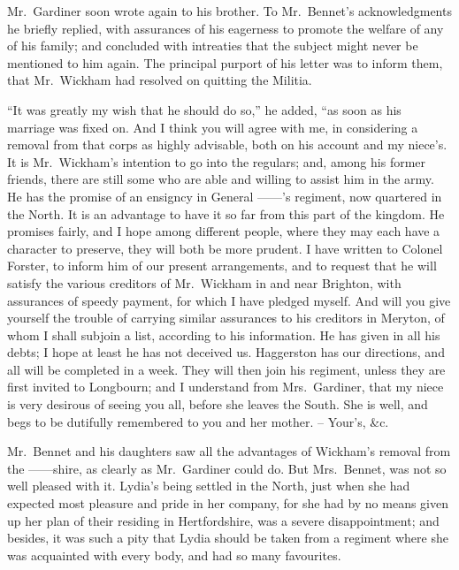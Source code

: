 \strut

Mr.\ Gardiner soon wrote again to his brother. To
Mr.\ Bennet’s acknowledgments he briefly replied, with
assurances of his eagerness to promote the welfare of any
of his family; and concluded with intreaties that the
subject might never be mentioned to him again. The
principal purport of his letter was to inform them, that
Mr.\ Wickham had resolved on quitting the Militia.

“It was greatly my wish that he should do so,” he
added, “as soon as his marriage was fixed on. And
I think you will agree with me, in considering a removal
from that corps as highly advisable, both on his account
and my niece’s. It is Mr.\ Wickham’s intention to go into
the regulars; and, among his former friends, there are
still some who are able and willing to assist him in the
army. He has the promise of an ensigncy in General
\hbox{------’s} regiment, now quartered in the North. It is an
advantage to have it so far from this part of the kingdom.
He promises fairly, and I hope among different people,
where they may each have a character to preserve, they
will both be more prudent. I have written to Colonel
Forster, to inform him of our present arrangements, and
to request that he will satisfy the various creditors of
Mr.\ Wickham in and near Brighton, with assurances of
speedy payment, for which I have pledged myself. And
will you give yourself the trouble of carrying similar
assurances to his creditors in Meryton, of whom I shall
subjoin a list, according to his information. He has
given in all his debts; I hope at least he has not deceived
us. Haggerston has our directions, and all will be completed
in a week. They will then join his regiment, unless
they are first invited to Longbourn; and I understand
from Mrs.\ Gardiner, that my niece is very desirous of
seeing you all, before she leaves the South. She is well,
and begs to be dutifully remembered to you and her
mother. -- Your’s, \&c.


\strut

Mr.\ Bennet and his daughters saw all the advantages
of Wickham’s removal from the \hbox{------shire}, as clearly as
Mr.\ Gardiner could do. But Mrs.\ Bennet, was not so well
pleased with it. Lydia’s being settled in the North, just
when she had expected most pleasure and pride in her
company, for she had by no means given up her plan of
their residing in Hertfordshire, was a severe disappointment;
and besides, it was such a pity that Lydia should
be taken from a regiment where she was acquainted with
every body, and had so many favourites.

